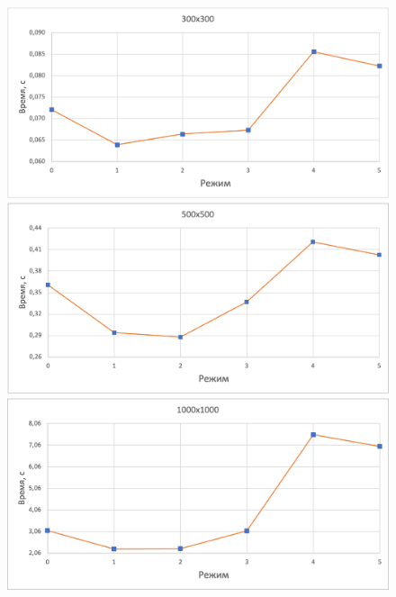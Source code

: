 \documentclass[12pt,a4paper,oneside,final]{article}
\begin{document}
\begin{figure}[h]
\centering
\includegraphics[width=0.8\linewidth]{300x300.png}
\includegraphics[width=0.8\linewidth]{500x500.png}
\includegraphics[width=0.8\linewidth]{1000x1000.png}
\label{fig:mpr}
\end{figure}
\end{document}
